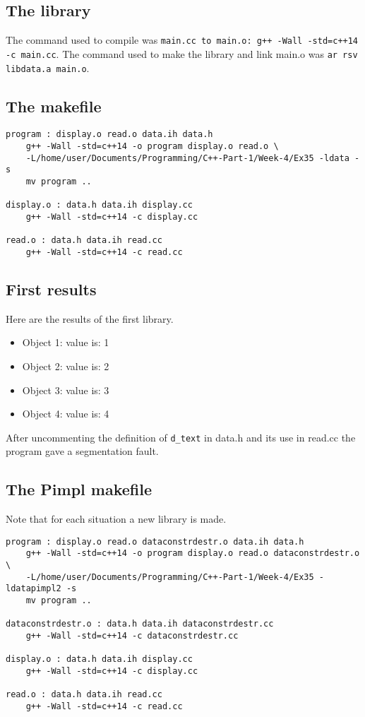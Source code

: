 \documentclass[11pt]{article}
\begin{document}
\subsection*{The library}
The command used to compile was \texttt{main.cc to main.o: g++ -Wall -std=c++14 -c main.cc}.
The command used to make the library and link main.o was \texttt{ar rsv libdata.a main.o}.

\subsection*{The makefile}
\begin{lstlisting}
program : display.o read.o data.ih data.h
	g++ -Wall -std=c++14 -o program display.o read.o \
    -L/home/user/Documents/Programming/C++-Part-1/Week-4/Ex35 -ldata -s
	mv program ..

display.o : data.h data.ih display.cc
	g++ -Wall -std=c++14 -c display.cc

read.o : data.h data.ih read.cc
	g++ -Wall -std=c++14 -c read.cc
\end{lstlisting}

\subsection*{First results}
Here are the results of the first library.
\begin{itemize}
\item Object 1: value is: 1
\item Object 2: value is: 2
\item Object 3: value is: 3
\item Object 4: value is: 4
\end{itemize}

After uncommenting the definition of \texttt{d\_text} in data.h and its use in read.cc the program gave a segmentation fault.

\subsection*{The Pimpl makefile}
Note that for each situation a new library is made.
\begin{lstlisting}
program : display.o read.o dataconstrdestr.o data.ih data.h
	g++ -Wall -std=c++14 -o program display.o read.o dataconstrdestr.o \
	-L/home/user/Documents/Programming/C++-Part-1/Week-4/Ex35 -ldatapimpl2 -s
	mv program ..

dataconstrdestr.o : data.h data.ih dataconstrdestr.cc
	g++ -Wall -std=c++14 -c dataconstrdestr.cc

display.o : data.h data.ih display.cc
	g++ -Wall -std=c++14 -c display.cc

read.o : data.h data.ih read.cc
	g++ -Wall -std=c++14 -c read.cc
\end{lstlisting}
\end{document}
